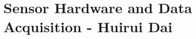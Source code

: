 \newpage
{}
\setlength{\parindent}{0pt}

\section{Sensor Hardware and Data Acquisition - Huirui Dai} \label{sensor_hardware_data_acquisition}






